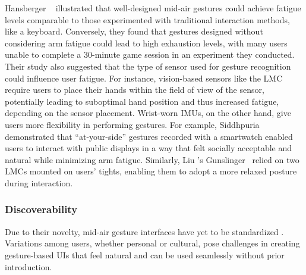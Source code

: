 Hansberger \etal~\cite{Hansberger:2017} illustrated that well-designed mid-air gestures could achieve fatigue levels comparable to those experimented with traditional interaction methods, like a keyboard. Conversely, they found that gestures designed without considering arm fatigue could lead to high exhaustion levels, with many users unable to complete a 30-minute game session in an experiment they conducted.
%
Their study also suggested that the type of sensor used for gesture recognition could influence user fatigue. For instance, vision-based sensors like the LMC require users to place their hands within the field of view of the sensor, potentially leading to suboptimal hand position and thus increased fatigue, depending on the sensor placement. 
%
Wrist-worn IMUs, on the other hand, give users more flexibility in performing gestures. For example, Siddhpuria \etal~\cite{Siddhpuria:2017} demonstrated that ``at-your-side'' gestures recorded with a smartwatch enabled users to interact with public displays in a way that felt socially acceptable and natural while minimizing arm fatigue. 
Similarly, Liu \etal's Gunslinger~\cite{Liu:2015} relied on two LMCs mounted on users' tights, enabling them to adopt a more relaxed posture during interaction.


\subsubsection{Discoverability} \label{sec:state_of_the_art:overview:challenges:discoverability}
Due to their novelty, mid-air gesture interfaces have yet to be standardized \cite{Norman:2010}. Variations among users, whether personal or cultural, pose challenges in creating gesture-based UIs that feel natural and can be used seamlessly without prior introduction.

